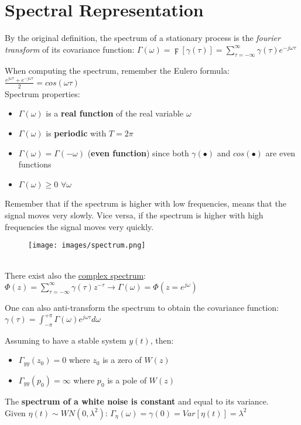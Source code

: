 \documentclass[10pt,a4paper]{article}
\begin{document}
\section{Spectral Representation}
By the original definition, the spectrum of a stationary process is the \textit{fourier transform} of its covariance function:
\center
 $\Gamma(\omega)=\digamma[\gamma(\tau)]=\sum_{\tau=-\infty}^{\infty} \gamma(\tau)e^{-j \omega \tau}$
 \\
 \vspace{0.5em}
 \raggedright
 When computing the spectrum, remember the Eulero formula:
 $\frac{e^{j \omega \tau}+e^{-j \omega \tau}}{2} = cos(\omega \tau)$
 \\
 Spectrum properties:
 \begin{itemize}
 	\item $\Gamma(\omega)$ is a \textbf{real function} of the real variable $\omega$
 	\item $\Gamma(\omega)$ is \textbf{periodic} with $T=2 \pi$
 	\item $\Gamma(\omega) =\Gamma(-\omega)$ (\textbf{even function}) since both $\gamma(\bullet)$ and $cos(\bullet)$ are even functions
 	\item $\Gamma(\omega) \geq 0$  $\forall \omega$
 \end{itemize}
 Remember that if the spectrum is higher with low frequencies, means that the signal moves very slowly. Vice versa, if the spectrum is higher with high frequencies the signal moves very quickly. 
 \begin{figure}[h!]
 \hfill \texttt{[image: images/spectrum.png]}\hspace*{\fill}
  \label{fig:spectrum}
\end{figure} \\
 There exist also the \uline{complex spectrum}:
 \center
 $\Phi (z)=\sum_{\tau=-\infty}^{\infty} \gamma (\tau)z^{-\tau} \rightarrow \Gamma(\omega)=\Phi(z=e^{j \omega})$
 \\
 \raggedright
 \vspace{0.5em}
 One can also anti-transform the spectrum to obtain the covariance function:
  \center
 $\gamma(\tau)=\int_{-\pi}^{+\pi} \Gamma(\omega)e^{j \omega \tau} d\omega$
 \\
  \vspace{0.5em}
\raggedright
Assuming to have a stable system $y(t)$, then:
\begin{itemize}
	\item $\Gamma_{yy}(z_0)=0$ where $z_0$ is a zero of $W(z)$
	\item $\Gamma_{yy}(p_0)=\infty$ where $p_0$ is a pole of $W(z)$
	\end{itemize}
 \vspace{0.5em}
 \raggedright 
  The \textbf{spectrum of a white noise is constant} and equal to its variance. \\
 Given  $\eta(t) \sim WN(0,\lambda^2)$:
 \center 
$\Gamma_\eta(\omega) = \gamma(0) = Var[\eta(t)] = \lambda^2$
\\
\raggedright
\end{document}
